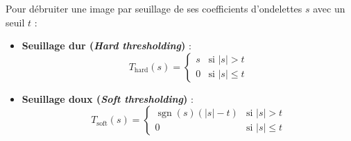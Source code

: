 \begin{definition}
    Pour débruiter une image par seuillage de ses coefficients d'ondelettes $s$ avec un seuil $t$ :
    \begin{itemize}
        \item \textbf{Seuillage dur (\emph{Hard thresholding})} :
            \begin{equation}
                T_{\text{hard}}(s) = \begin{cases} s & \text{si } |s| > t \\ 0 & \text{si } |s| \leqslant t \end{cases}
            \end{equation}
        \item \textbf{Seuillage doux (\emph{Soft thresholding})} :
            \begin{equation}
                T_{\text{soft}}(s) = \begin{cases} \operatorname{sgn}(s)(|s| - t) & \text{si } |s| > t \\ 0 & \text{si } |s| \leqslant t \end{cases}
            \end{equation}
    \end{itemize}
\end{definition}